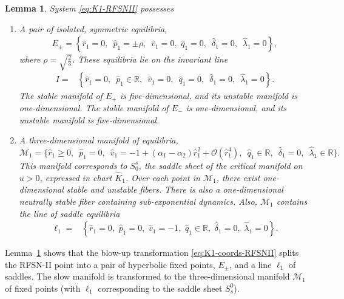 \documentclass[11pt]{article}
\def\R{\mathbb{R}}
\numberwithin{equation}{section}
\newtheorem{lemma}{Lemma}[section]
\begin{document}
\begin{lemma}\label{lem-K1}
System \eqref{eq:K1-RFSNII} possesses
\begin{enumerate}
    \item A pair of isolated, symmetric equilibria, 
\begin{align}\label{eq:def-Epm-RFSNII}
    E_{\pm} = \left\{ \hat{r}_{1}=0,\, \, \, \hat{p}_{1}=\pm \rho, \, \, \, 
    \hat{v}_{1}=0,\, \, \hat{q}_{1}=0, \, \, \, \hat{\delta}_{1}=0, \, \, \,
    \hat{\lambda}_{1}=0 \right\},
\end{align}
where $\rho = \sqrt{\tfrac{2}{3}}$.
These equilibria lie on the invariant line  
\begin{align}\label{eq:def-I}
    I=&\left\{\hat{r}_{1}=0,\, \, \, \hat{p}_{1}\in\R, \, \, \, 
    \hat{v}_{1}=0, \, \, \, \hat{q}_{1}=0, \, \, \, \hat{\delta}_{1}=0,
    \, \, \, \hat{\lambda}_{1}=0\right\}.
\end{align}
The stable manifold of $E_{+}$ is five-dimensional, and its unstable manifold is one-dimensional. 
The stable manifold of $E_{-}$ is one-dimensional, and its unstable manifold is five-dimensional.
%    
    \item A three-dimensional manifold of equilibria, 
    \begin{equation}\label{eq:def-M1}
        \mathcal{M}_{1}
        =\Big\{\hat{r}_{1}\ge 0, \, \, \, 
        \hat{p}_{1}=0, \, \, \, 
        \hat{v}_{1}=-1+(\alpha_1-\alpha_2) \hat r_1^2 + \mathcal O(\hat r_1^4), \, \, \, 
        \hat{q}_{1}\in\mathbb{R}, \, \, \, 
        \hat{\delta}_{1}=0, \, \, \, 
        \hat{\lambda}_{1}\in\mathbb{R}
        \Big\}.
    \end{equation}
    This manifold corresponds to $S_0^s$, the saddle sheet of the critical manifold on $u>0$, expressed in chart $\hat{K}_1$.
    Over each point in $\mathcal{M}_{1}$, there exist one-dimensional stable and unstable fibers.
    There is also a one-dimensional neutrally stable fiber containing sub-exponential dynamics.
    Also, $\mathcal{M}_1$ contains the line of saddle equilibria
\begin{align}\label{eq:def-ell1}
    \ell_{1}=&\left\{\hat{r}_{1}=0, \, \, \hat{p}_{1}=0, \, \,
    \hat{v}_{1}=-1, \, \, \hat{q}_{1}\in\R, \, \, 
    \hat{\delta}_{1}=0, \, \, \hat{\lambda}_{1}=0\right\}.
\end{align}
\end{enumerate}
\end{lemma} 

\noindent 
Lemma~\ref{lem-K1} shows that the blow-up transformation \eqref{eq:K1-coords-RFSNII} splits the RFSN-II point into a pair of hyperbolic fixed points, $E_{\pm}$, and a line $\ell_1$ of saddles.
The slow manifold is transformed to the three-dimensional manifold $\mathcal M_1$ of fixed points (with $\ell_1$ corresponding to the saddle sheet $S_s^0$).
\end{document}
